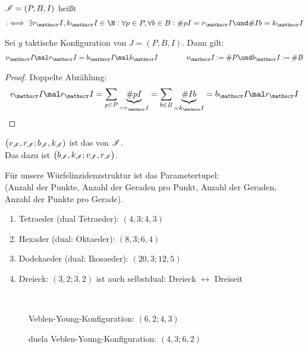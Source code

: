 \begin{definition}
	$\mathscr{I}=(P,B,I)$ heißt  
	\begin{align*}
		:\iff\exists r_\Inz,k_\Inz\in\N:\forall p\in P,\forall b\in B:\# pI=r_\Inz\und\#Ib=k_\Inz
	\end{align*}
\end{definition}

\begin{lemma}
	Sei $y$ taktische Konfiguration von $J=(P,B,I)$. Dann gilt:
	\begin{align*}
		v_\Inz\mal r_\Inz=b_\Inz\mal k_\Inz
		\qquad\mit\qquad
		v_\Inz:=\# P\und b_\Inz:=\#B
	\end{align*}
\end{lemma}

\begin{proof}
	Doppelte Abzählung: 
	\begin{align*}
		v_\Inz\mal r_\Inz=\sum\limits_{p\in P}\underbrace{\# pI}_{=r_\Inz}=\sum\limits_{b\in B}\underbrace{\#Ib}_{=k_\Inz}=b_\Inz\mal r_\Inz
	\end{align*}
\end{proof}


\begin{definition}
	$\big(v_{\mathscr{I}},r_{\mathscr{I}};b_{\mathscr{I}},k_{\mathscr{I}})$ ist das  von $\mathscr{I}$.
	\\
	Das dazu  ist $\big(b_{\mathscr{I}},k_{\mathscr{I}};v_{\mathscr{I}},r_{\mathscr{I}}\big)$.
\end{definition}

\begin{beispiel}
	Für unsere Würfelinzidenzstruktur ist das Parametertupel:\\
	(Anzahl der Punkte, Anzahl der Geraden pro Punkt, Anzahl der Geraden, Anzahl der Punkte pro Gerade).
	\begin{enumerate}
		\item Tetraeder (dual Tetraeder): $(4,3;4,3)$ 
		\item Hexader (dual: Oktaeder): $(8,3;6,4)$
		\item Dodekaeder (dual: Ikosaeder): $(20,3;12,5)$
		\item Dreieck: $(3,2;3,2)$ ist auch selbstdual: Dreieck $\leftrightarrow$ Dreiseit
	\end{enumerate}
\end{beispiel}

\begin{beispiel}\
	\begin{figure}[H] %
		\begin{center}
			
			\caption{Veblen-Young-Konfiguration: $(6,2;4,3)$}
		\end{center}
	\end{figure}
	\begin{figure}[H] %
		\begin{center}
			
			\caption{duela Veblen-Young-Konfiguration: $(4,3;6,2)$}
		\end{center}
	\end{figure}	
\end{beispiel}

